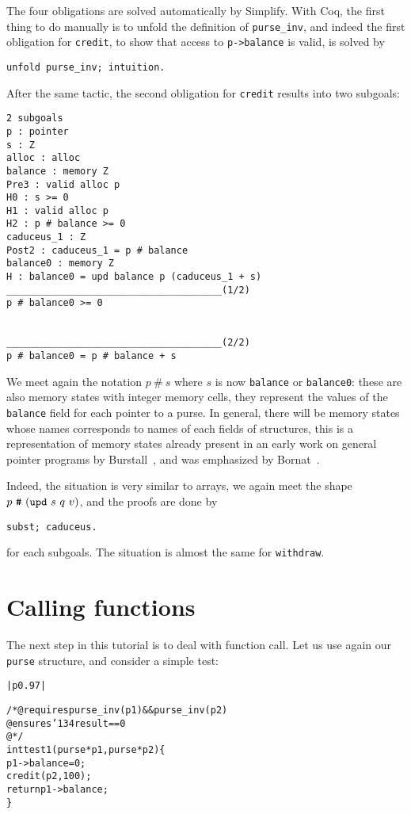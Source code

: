 \documentclass[12pt,a4paper,twoside,openright]{report}
\makeatletter
\newcommand{\indextt}[1]{\index{#1@\texttt{#1}}}
\newenvironment{code}{\begin{small}\begin{alltt}%
\begin{tabular}{|p{0.97\textwidth}|}\hline%
}{\\\hline\end{tabular}\end{alltt}\end{small}}
\def\result{\char'134 result}
\makeatother
\begin{document}
The four obligations are solved automatically by Simplify. With Coq,
the first thing to do manually is to unfold the definition of
\verb|purse_inv|, and indeed the first obligation for \verb|credit|,
to show that access to \verb|p->balance| is valid, is solved by
\begin{verbatim}
unfold purse_inv; intuition.
\end{verbatim}
After the same tactic, the second obligation for \verb|credit| results
into two subgoals:
\begin{verbatim}
2 subgoals
p : pointer
s : Z
alloc : alloc
balance : memory Z
Pre3 : valid alloc p
H0 : s >= 0
H1 : valid alloc p
H2 : p # balance >= 0
caduceus_1 : Z
Post2 : caduceus_1 = p # balance
balance0 : memory Z
H : balance0 = upd balance p (caduceus_1 + s)
______________________________________(1/2)
p # balance0 >= 0


______________________________________(2/2)
p # balance0 = p # balance + s
\end{verbatim}
We meet again the notation $p~\#~s$ where $s$ is now \verb|balance| or
\verb|balance0|: these are also memory states with integer memory
cells, they represent the values of the \verb|balance| field for each
pointer to a purse. In general, there will be memory states whose
names corresponds to names of each fields of structures, this is a
representation of memory states already present in an early work on
general pointer programs by Burstall~\cite{burstall72}, and was emphasized
by Bornat~\cite{bornat00mpc}.

Indeed, the situation is very similar to arrays, we again meet the
shape $p~\verb|#|~(\verb|upd|~s~q~v)$, and the proofs are done by
\begin{verbatim}
subst; caduceus.
\end{verbatim}
for each subgoals. The situation is almost the same for
\verb|withdraw|.

\section{Calling functions}
\label{assigns}\indextt{assigns}

The next step in this tutorial is to deal with function call. Let us
use again our \verb|purse| structure, and consider a simple test:
\begin{code}
/*@ requires purse_inv(p1) && purse_inv(p2)
  @ ensures \result == 0
  @*/
int test1(purse *p1, purse *p2) \{
    p1->balance = 0;
    credit(p2,100);
    return p1->balance;
\}
\end{code}
\end{document}
